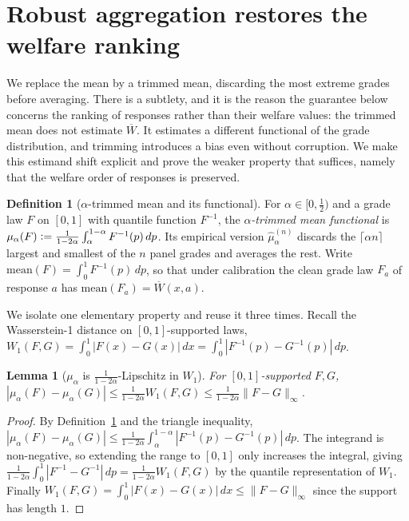 \documentclass[11pt]{article}
\theoremstyle{plain}
\newtheorem{lemma}{Lemma}
\theoremstyle{definition}
\newtheorem{definition}{Definition}
\theoremstyle{remark}
\newcommand{\Wbar}{\overline{W}}
\newcommand{\defeq}{\vcentcolon=}
\begin{document}
\section{Robust aggregation restores the welfare ranking}
\label{sec:robust}

We replace the mean by a trimmed mean, discarding the most extreme grades before averaging.
There is a subtlety, and it is the reason the guarantee below concerns the ranking of responses
rather than their welfare values: the trimmed mean does not estimate $\Wbar$. It estimates a
different functional of the grade distribution, and trimming introduces a bias even without
corruption. We make this estimand shift explicit and prove the weaker property that suffices,
namely that the welfare order of responses is preserved.

\begin{definition}[$\alpha$-trimmed mean and its functional]
\label{def:trim}
For $\alpha\in[0,\tfrac12)$ and a grade law $F$ on $[0,1]$ with quantile function $F^{-1}$, the
\emph{$\alpha$-trimmed mean functional} is
$\mu_\alpha(F)\defeq\frac{1}{1-2\alpha}\int_\alpha^{1-\alpha}F^{-1}(p)\,dp$. Its empirical
version $\hat\mu_\alpha^{(n)}$ discards the $\lceil\alpha n\rceil$ largest and smallest of the
$n$ panel grades and averages the rest. Write $\mathrm{mean}(F)=\int_0^1 F^{-1}(p)\,dp$, so
that under calibration the clean grade law $F_a$ of response $a$ has
$\mathrm{mean}(F_a)=\Wbar(x,a)$.
\end{definition}

We isolate one elementary property and reuse it three times. Recall the Wasserstein-1 distance
on $[0,1]$-supported laws, $W_1(F,G)=\int_0^1|F(x)-G(x)|\,dx=\int_0^1|F^{-1}(p)-G^{-1}(p)|\,dp$.

\begin{lemma}[$\mu_\alpha$ is $\tfrac{1}{1-2\alpha}$-Lipschitz in $W_1$]
\label{lem:lip}
For $[0,1]$-supported $F,G$,
$|\mu_\alpha(F)-\mu_\alpha(G)|\le\frac{1}{1-2\alpha}W_1(F,G)\le\frac{1}{1-2\alpha}\|F-G\|_\infty$.
\end{lemma}

\begin{proof}
By Definition~\ref{def:trim} and the triangle inequality,
$|\mu_\alpha(F)-\mu_\alpha(G)|\le\frac{1}{1-2\alpha}\int_\alpha^{1-\alpha}|F^{-1}(p)-G^{-1}(p)|\,dp$.
The integrand is non-negative, so extending the range to $[0,1]$ only increases the integral,
giving $\frac{1}{1-2\alpha}\int_0^1|F^{-1}-G^{-1}|\,dp=\frac{1}{1-2\alpha}W_1(F,G)$ by the
quantile representation of $W_1$. Finally $W_1(F,G)=\int_0^1|F(x)-G(x)|\,dx\le\|F-G\|_\infty$
since the support has length $1$.
\end{proof}
\end{document}

